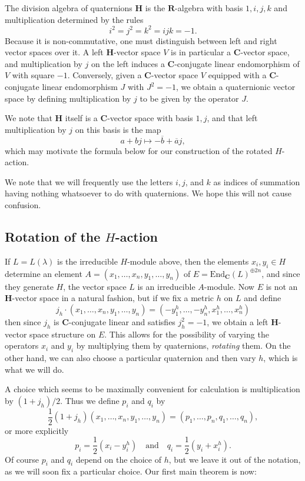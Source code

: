 \documentclass[12pt, reqno]{amsart}
\numberwithin{equation}{section}
\theoremstyle{definition}
\theoremstyle{plain}
\newcommand{\CC}{\mathbf{C}}
\newcommand{\HH}{\mathbf{H}}
\newcommand{\RR}{\mathbf{R}}
\begin{document}
The division algebra of quaternions $\HH$ is the $\RR$-algebra with basis $1,i,j,k$ and multiplication determined by the rules
$$i^2=j^2=k^2=ijk=-1.$$ Because it is non-commutative, one must distinguish between left and right vector spaces over it. A left $\HH$-vector space $V$ is in particular a $\CC$-vector space, and multiplication by $j$ on the left induces a $\CC$-conjugate linear endomorphism of $V$ with square $-1$. Conversely, given a $\CC$-vector space $V$ equipped with a $\CC$-conjugate linear endomorphism $J$ with $J^2=-1$, we obtain a quaternionic vector space by defining multiplication by $j$ to be given by the operator $J$. 

We note that $\HH$ itself is a $\CC$-vector space with basis $1,j$, and that left multiplication by $j$ on this basis is the map
$$a+bj \mapsto -\overline{b} + \overline{a}j,$$ which may motivate the formula below for our construction of the rotated $H$-action.

We note that we will frequently use the letters $i,j$, and $k$ as indices of summation having nothing whatsoever to do with quaternions. We hope this will not cause confusion.

\subsection{Rotation of the $H$-action}

If $L=L(\lambda)$ is the irreducible $H$-module above, then the elements $x_i,y_i \in H$ determine an element $A=(x_1,\dots,x_n,y_1,\dots,y_n)$ of $E=\mathrm{End}_\CC(L)^{\oplus 2n}$, and since they generate $H$, the vector space $L$ is an irreducible $A$-module. Now $E$ is not an $\HH$-vector space in a natural fashion, but if we fix a metric $h$ on $L$ and define
$$j_h \cdot (x_1,\dots,x_n,y_1,\dots,y_n)=(-y_1^h,\dots,-y_n^h,x_1^h,\dots,x_n^h)$$ then since $j_h$ is $\CC$-conjugate linear and satisfies $j_h^2=-1$, we obtain a left $\HH$-vector space structure on $E$. This allows for the possibility of varying the operators $x_i$ and $y_i$ by multiplying them by quaternions, \emph{rotating} them. On the other hand, we can also choose a particular quaternion and then vary $h$, which is what we will do. 

A choice which seems to be maximally convenient for calculation is multiplication by $(1+j_h)/2$. Thus we define $p_i$ and $q_i$ by
$$\frac{1}{2}(1+j_h)(x_1,\dots,x_n,y_1,\dots,y_n)=(p_1,\dots,p_n,q_1,\dots,q_n),$$ or more explicitly
$$p_i=\frac{1}{2}(x_i-y_i^h) \quad \text{and} \quad q_i=\frac{1}{2}(y_i+x_i^h).$$ Of course $p_i$ and $q_i$ depend on the choice of $h$, but we leave it out of the notation, as we will soon fix a particular choice. Our first main theorem is now:
\end{document}
